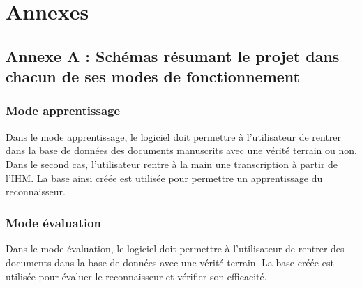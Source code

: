 \chapter{Annexes}

\section{Annexe A : Schémas résumant le projet dans chacun de ses modes de fonctionnement}

\subsection{Mode apprentissage}

Dans le mode apprentissage, le logiciel doit permettre à l’utilisateur de rentrer dans la
base de données des documents manuscrits avec une vérité terrain ou non. Dans le second cas,
l’utilisateur rentre à la main une transcription à partir de l’IHM. La base ainsi créée est
utilisée pour permettre un apprentissage du reconnaisseur.

\paragraph{}
\begin{mdframed}[frametitle={Annexe A.1.1 : Avec détection de lignes}, innerbottommargin=10]
\begin{center}
\end{center}
\end{mdframed}

\paragraph{}
\begin{mdframed}[frametitle={Annexe A.1.2 : Sans détection de lignes}, innerbottommargin=10]
\begin{center}
\end{center}
\end{mdframed}

\subsection{Mode évaluation}

Dans le mode évaluation, le logiciel doit permettre à l’utilisateur de rentrer des documents
dans la base de données avec une vérité terrain. La base créée est utilisée pour évaluer
le reconnaisseur et vérifier son efficacité.

